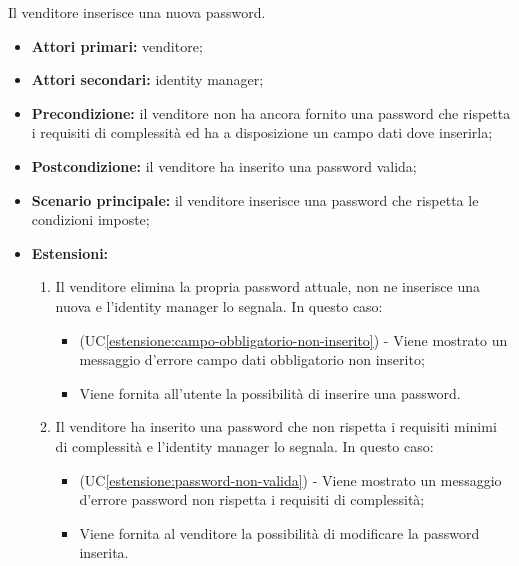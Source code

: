 \label{modifica-informazioni-venditore.password.nuova-password}

Il venditore inserisce una nuova password.
\begin{itemize}
	\item \textbf{Attori primari:} venditore;
	\item \textbf{Attori secondari:} identity manager;
	\item \textbf{Precondizione:} il venditore non ha ancora fornito una password che rispetta i requisiti di complessità ed ha a disposizione un campo dati dove inserirla;
	\item \textbf{Postcondizione:} il venditore ha inserito una password valida;
	\item \textbf{Scenario principale:} il venditore inserisce una password che rispetta le condizioni imposte;
	\item \textbf{Estensioni:}
	\begin{enumerate}[label=\lett]
		\item Il venditore elimina la propria password attuale, non ne inserisce una nuova e l'identity manager lo segnala. In questo caso:
		\begin{itemize}
			\item (UC\ref{estensione:campo-obbligatorio-non-inserito}) - Viene mostrato un messaggio d'errore campo dati obbligatorio non inserito;
			\item Viene fornita all'utente la possibilità di inserire una password.
		\end{itemize}
		\item Il venditore ha inserito una password che non rispetta i requisiti minimi di complessità e l'identity manager lo segnala. In questo caso:
		\begin{itemize}
			\item (UC\ref{estensione:password-non-valida}) - Viene mostrato un messaggio d'errore password non rispetta i requisiti di complessità;
			\item Viene fornita al venditore la possibilità di modificare la password inserita.
		\end{itemize}
	\end{enumerate} 
\end{itemize}

\label{modifica-informazioni-venditore.password.conferma-nuova-password}

